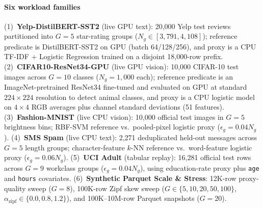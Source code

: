 \paragraph{Six workload families}
(1)~\textbf{Yelp-DistilBERT-SST2} (live GPU text): 20,000 Yelp test reviews partitioned into $G=5$ star-rating groups ($N_g \in [3{,}791, 4{,}108]$); reference predicate is DistilBERT-SST2 on GPU (batch 64/128/256), and proxy is a CPU TF-IDF + Logistic Regression trained on a disjoint 18,000-row prefix.
(2)~\textbf{CIFAR10-ResNet34-GPU} (live GPU vision): 10,000 CIFAR-10 test images across $G=10$ classes ($N_g = 1{,}000$ each); reference predicate is an ImageNet-pretrained ResNet34 fine-tuned and evaluated on GPU at standard $224\times 224$ resolution to detect animal classes, and proxy is a CPU logistic model on $4\times 4$ RGB averages plus channel standard deviations (51 features).
(3)~\textbf{Fashion-MNIST} (live CPU vision): 10,000 official test images in $G=5$ brightness bins; RBF-SVM reference vs.\ pooled-pixel logistic proxy ($\epsilon_g = 0.04 N_g$).
(4)~\textbf{SMS Spam} (live CPU text): 2,271 deduplicated held-out messages across $G=5$ length groups; character-feature $k$-NN reference vs.\ word-feature logistic proxy ($\epsilon_g = 0.06 N_g$).
(5)~\textbf{UCI Adult} (tabular replay): 16,281 official test rows across $G=9$ workclass groups ($\epsilon_g = 0.04 N_g$), using education-rate proxy plus \texttt{age} and \texttt{hours} covariates.
(6)~\textbf{Synthetic Parquet Scale \& Stress}: 12K-row proxy-quality sweep ($G=8$), 100K-row Zipf skew sweep ($G \in \{5,10,20,50,100\}$, $\alpha_{\text{zipf}} \in \{0.0, 0.8, 1.2\}$), and 100K--10M-row Parquet snapshots ($G=20$).

